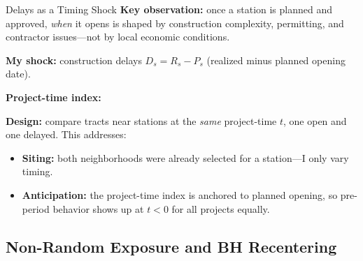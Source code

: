 \documentclass{beamer}
\begin{document}
\begin{frame}{Delays as a Timing Shock}
\small
\textbf{Key observation:} once a station is planned and approved, \emph{when} it opens
is shaped by construction complexity, permitting, and contractor issues---not by local
economic conditions.

\medskip
\textbf{My shock:} construction delays $D_s = R_s - P_s$ (realized minus planned opening date).

\medskip
\textbf{Project-time index:}
\begin{center}
\end{center}

\medskip
\textbf{Design:} compare tracts near stations at the \emph{same} project-time $t$, one
open and one delayed. This addresses:
\begin{itemize}
    \item[$\checkmark$] \textbf{Siting:} both neighborhoods were already selected for a
          station---I only vary timing.
    \item[$\checkmark$] \textbf{Anticipation:} the project-time index is anchored to planned
          opening, so pre-period behavior shows up at $t<0$ for all projects equally.
\end{itemize}
\end{frame}

\subsection{Non-Random Exposure and BH Recentering}
\end{document}
